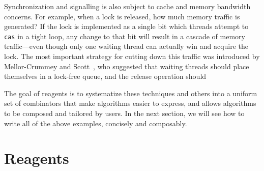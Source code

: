 \documentclass[preprint]{sigplanconf}
\begin{document}
Synchronization and signalling is also subject to cache and memory bandwidth
concerns.  For example, when a lock is released, how much memory traffic is
generated?  If the lock is implemented as a single bit which threads attempt to
\lstinline{cas} in a tight loop, any change to that bit will result in a cascade
of memory traffic---even though only one waiting thread can actually win and
acquire the lock.  The most important strategy for cutting down this traffic was
introduced by Mellor-Crummey and Scott~\cite{?}, who suggested that waiting
threads should place themselves in a lock-free queue, and the release operation
should  %



The goal of reagents is to systematize these techniques and others into a
uniform set of combinators that make algorithms easier to express, and allows
algorithms to be composed and tailored by users.  In the next section, we will
see how to write all of the above examples, concisely and composably.


\section{Reagents}
\label{sec:reagents}
\end{document}
